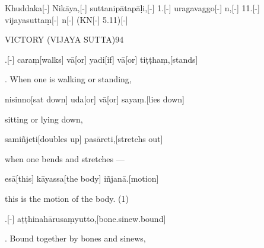 
\begin{samepage}
\begingl[glneveryline={\PaliGlossA,\PaliGlossB}]
Khuddaka[-] Nikāya,[-] suttanipātapāḷi,[-] 1.[-] uragavaggo[-] n,[-] 11.[-] vijayasuttaṃ[-] n[-] (KN[-] 5.11)[-]
\endgl
\nopagebreak
\linespread{0.5}
\begin{spacin}{0.2}
{ VICTORY (VIJAYA SUTTA)94}
\end{spacin}
\vskip 12pt
\end{samepage}
\vskip 0.2in
\begin{samepage}
.[-] caraṃ[walks] vā[or] yadi[if] vā[or] tiṭṭhaṃ,[stands]
\endgl
\nopagebreak
\linespread{0.5}
\begin{spacin}{0.2}
{. When one is walking or standing,}
\end{spacin}
\vskip 12pt
\end{samepage}
\begin{samepage}
\begingl[glneveryline={\PaliGlossA,\PaliGlossB}]
nisinno[sat down] uda[or] vā[or] sayaṃ.[lies down]
\endgl
\nopagebreak
\linespread{0.5}
\begin{spacin}{0.2}
{\PaliGlossFT sitting or lying down,}
\end{spacin}
\vskip 12pt
\end{samepage}
\begin{samepage}
\begingl[glneveryline={\PaliGlossA,\PaliGlossB}]
samiñjeti[doubles up] pasāreti,[stretchs out]
\endgl
\nopagebreak
\linespread{0.5}
\begin{spacin}{0.2}
{\PaliGlossFT when one bends and stretches —}
\end{spacin}
\vskip 12pt
\end{samepage}
\begin{samepage}
\begingl[glneveryline={\PaliGlossA,\PaliGlossB}]
esā[this] kāyassa[the body] iñjanā.[motion]
\endgl
\nopagebreak
\linespread{0.5}
\begin{spacin}{0.2}
{\PaliGlossFT this is the motion of the body. (1)}
\end{spacin}
\vskip 12pt
\end{samepage}
\vskip 0.2in
\begin{samepage}
.[-] aṭṭhinahārusaṃyutto,[bone.sinew.bound]
\endgl
\nopagebreak
\linespread{0.5}
\begin{spacin}{0.2}
{. Bound together by bones and sinews,}
\end{spacin}
\vskip 12pt
\end{samepage}
